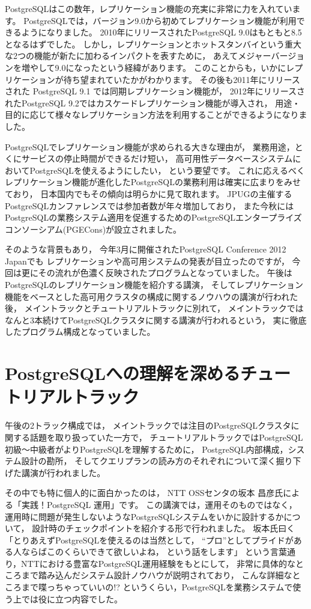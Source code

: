 PostgreSQLはこの数年，レプリケーション機能の充実に非常に力を入れています。
PostgreSQLでは，バージョン9.0から初めてレプリケーション機能が利用できるようになりました。
2010年にリリースされたPostgreSQL 9.0はもともと8.5となるはずでした。
しかし，レプリケーションとホットスタンバイという重大な2つの機能が新たに加わるインパクトを表すために，
あえてメジャーバージョンを増やして9.0になったという経緯があります。
このことからも，いかにレプリケーションが待ち望まれていたかがわかります。
その後も2011年にリリースされた PostgreSQL 9.1 では同期レプリケーション機能が，
2012年にリリースされたPostgreSQL 9.2ではカスケードレプリケーション機能が導入され，
用途・目的に応じて様々なレプリケーション方法を利用することができるようになりました。

PostgreSQLでレプリケーション機能が求められる大きな理由が，
業務用途，とくにサービスの停止時間ができるだけ短い，
高可用性データベースシステムにおいてPostgreSQLを使えるようにしたい，
という要望です。
これに応えるべくレプリケーション機能が進化したPostgreSQLの業務利用は確実に広まりをみせており，
日本国内でもその傾向は明らかに見て取れます。
JPUGの主催するPostgreSQLカンファレンスでは参加者数が年々増加しており，
また今秋にはPostgreSQLの業務システム適用を促進するためのPostgreSQLエンタープライズコンソーシアム(PGECons)が設立されました。

そのような背景もあり，
今年3月に開催されたPostgreSQL Conference 2012 Japanでも
レプリケーションや高可用システムの発表が目立ったのですが，
今回は更にその流れが色濃く反映されたプログラムとなっていました。
午後はPostgreSQLのレプリケーション機能を紹介する講演，
そしてレプリケーション機能をベースとした高可用クラスタの構成に関するノウハウの講演が行われた後，
メイントラックとチュートリアルトラックに別れて，
メイントラックではなんと3本続けてPostgreSQLクラスタに関する講演が行われるという，
実に徹底したプログラム構成となっていました。

\section{PostgreSQLへの理解を深めるチュートリアルトラック}

午後の2トラック構成では，
メイントラックでは注目のPostgreSQLクラスタに関する話題を取り扱っていた一方で，
チュートリアルトラックではPostgreSQL初級〜中級者がよりPostgreSQLを理解するために，
PostgreSQL内部構成，システム設計の勘所，
そしてクエリプランの読み方のそれぞれについて深く掘り下げた講演が行われました。

その中でも特に個人的に面白かったのは，
NTT OSSセンタの坂本 昌彦氏による「実践！PostgreSQL 運用」です。
この講演では，運用そのものではなく，
運用時に問題が発生しないようなPostgreSQLシステムをいかに設計するかについて，
設計時のチェックポイントを紹介する形で行われました。
坂本氏曰く「とりあえずPostgreSQLを使えるのは当然として，
``プロ''としてプライドがある人ならばこのくらいできて欲しいよね，
という話をします」
という言葉通り，NTTにおける豊富なPostgreSQL運用経験をもとにして，
非常に具体的なところまで踏み込んだシステム設計ノウハウが説明されており，
こんな詳細なところまで喋っちゃっていいの!?
というくらい，PostgreSQLを業務システムで使う上では役に立つ内容でした。

